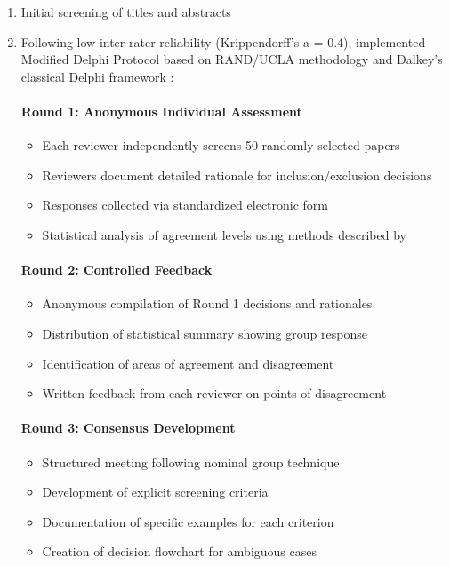 \documentclass[a4paper,12pt]{article}
\begin{document}
\begin{enumerate}
    \item Initial screening of titles and abstracts
    \item Following low inter-rater reliability (Krippendorff's a = 0.4), implemented Modified Delphi Protocol based on RAND/UCLA methodology \citep{fitch2001rand} and Dalkey's classical Delphi framework \citep{dalkey1969delphi}:
    
    \paragraph{Round 1: Anonymous Individual Assessment}
    \begin{itemize}
        \item Each reviewer independently screens 50 randomly selected papers
        \item Reviewers document detailed rationale for inclusion/exclusion decisions
        \item Responses collected via standardized electronic form
        \item Statistical analysis of agreement levels using methods described by \citet{diamond2014results}
    \end{itemize}
    
    \paragraph{Round 2: Controlled Feedback}
    \begin{itemize}
        \item Anonymous compilation of Round 1 decisions and rationales
        \item Distribution of statistical summary showing group response
        \item Identification of areas of agreement and disagreement
        \item Written feedback from each reviewer on points of disagreement
    \end{itemize}
    
    \paragraph{Round 3: Consensus Development}
    \begin{itemize}
        \item Structured meeting following nominal group technique \citep{delbecq1975group}
        \item Development of explicit screening criteria
        \item Documentation of specific examples for each criterion
        \item Creation of decision flowchart for ambiguous cases
    \end{itemize}




\end{enumerate}
\end{document}
